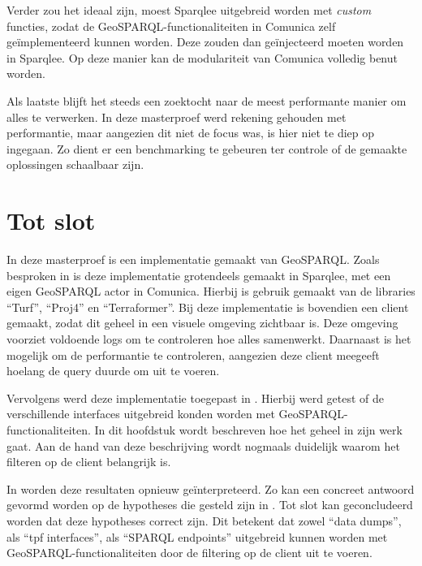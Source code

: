 Verder zou het ideaal zijn, moest Sparqlee uitgebreid worden met \textit{custom} functies, zodat de GeoSPARQL-functionaliteiten in Comunica zelf geïmplementeerd kunnen worden. Deze zouden dan geïnjecteerd moeten worden in Sparqlee. Op deze manier kan de modulariteit van Comunica volledig benut worden.

Als laatste blijft het steeds een zoektocht naar de meest performante manier om alles te verwerken. In deze masterproef werd rekening gehouden met performantie, maar aangezien dit niet de focus was, is hier niet te diep op ingegaan. Zo dient er een benchmarking te gebeuren ter controle of de gemaakte oplossingen schaalbaar zijn.

\section{Tot slot}
In deze masterproef is een implementatie gemaakt van GeoSPARQL. Zoals besproken in  is deze implementatie grotendeels gemaakt in Sparqlee, met een eigen GeoSPARQL actor in Comunica. Hierbij is gebruik gemaakt van de libraries ``Turf'', ``Proj4'' en ``Terraformer''. Bij deze implementatie is bovendien een client gemaakt, zodat dit geheel in een visuele omgeving zichtbaar is. Deze omgeving voorziet voldoende logs om te controleren hoe alles samenwerkt. Daarnaast is het mogelijk om de performantie te controleren, aangezien deze client meegeeft hoelang de query duurde om uit te voeren. 

Vervolgens werd deze implementatie toegepast in . Hierbij werd getest of de verschillende interfaces uitgebreid konden worden met GeoSPARQL-functionaliteiten. In dit hoofdstuk wordt beschreven hoe het geheel in zijn werk gaat. Aan de hand van deze beschrijving wordt nogmaals duidelijk waarom het filteren op de client belangrijk is. 

In  worden deze resultaten opnieuw geïnterpreteerd. Zo kan een concreet antwoord gevormd worden op de hypotheses die gesteld zijn in . Tot slot kan geconcludeerd worden dat deze hypotheses correct zijn. Dit betekent dat zowel ``data dumps'', als ``\acrshort{tpf} interfaces'', als ``SPARQL endpoints'' uitgebreid kunnen worden met GeoSPARQL-functionaliteiten door de filtering op de client uit te voeren.